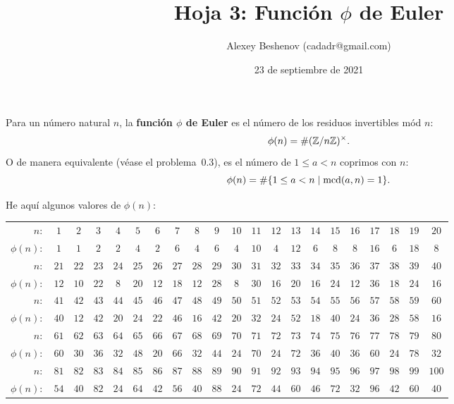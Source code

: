 \documentclass{article}
\title{Hoja 3: Función $\phi$ de Euler}
\author{Alexey Beshenov (cadadr@gmail.com)}
\date{23 de septiembre de 2021}
\begin{document}
\maketitle

\setcounter{section}{3}

\begin{definicion}
  Para un número natural $n$, la \textbf{función $\phi$ de Euler} es el número
  de los residuos invertibles mód $n$:
  $$\phi (n) = \# (\mathbb{Z}/n\mathbb{Z})^\times.$$
  O de manera equivalente (véase el problema~0.3),
  es el número de $1 \le a < n$ coprimos con $n$:
  $$\phi (n) = \# \{ 1 \le a < n \mid \operatorname{mcd} (a,n) = 1 \}.$$
\end{definicion}

\begin{ejemplo}
  He aquí algunos valores de $\phi (n)$:

  \begin{center}
    \begin{tabular}{rcccccccccccccccccccc}
      \hline
      $n\colon$ & $1$& $2$& $3$& $4$& $5$& $6$& $7$& $8$& $9$& $10$& $11$& $12$& $13$& $14$& $15$& $16$& $17$& $18$& $19$& $20$ \\
      $\phi(n)\colon$ & $1$& $1$& $2$& $2$& $4$& $2$& $6$& $4$& $6$& $4$& $10$& $4$& $12$& $6$& $8$& $8$& $16$& $6$& $18$& $8$ \\
      \hline
      $n\colon$ & $21$& $22$& $23$& $24$& $25$& $26$& $27$& $28$& $29$& $30$& $31$& $32$& $33$& $34$& $35$& $36$& $37$& $38$& $39$& $40$ \\
      $\phi(n)\colon$ & $12$& $10$& $22$& $8$& $20$& $12$& $18$& $12$& $28$& $8$& $30$& $16$& $20$& $16$& $24$& $12$& $36$& $18$& $24$& $16$ \\
      \hline
      $n\colon$ & $41$& $42$& $43$& $44$& $45$& $46$& $47$& $48$& $49$& $50$& $51$& $52$& $53$& $54$& $55$& $56$& $57$& $58$& $59$& $60$ \\
      $\phi(n)\colon$ & $40$& $12$& $42$& $20$& $24$& $22$& $46$& $16$& $42$& $20$& $32$& $24$& $52$& $18$& $40$& $24$& $36$& $28$& $58$& $16$ \\
      \hline
      $n\colon$ & $61$& $62$& $63$& $64$& $65$& $66$& $67$& $68$& $69$& $70$& $71$& $72$& $73$& $74$& $75$& $76$& $77$& $78$& $79$& $80$ \\
      $\phi(n)\colon$ & $60$& $30$& $36$& $32$& $48$& $20$& $66$& $32$& $44$& $24$& $70$& $24$& $72$& $36$& $40$& $36$& $60$& $24$& $78$& $32$ \\
      \hline
      $n\colon$ & $81$& $82$& $83$& $84$& $85$& $86$& $87$& $88$& $89$& $90$& $91$& $92$& $93$& $94$& $95$& $96$& $97$& $98$& $99$& $100$ \\
      $\phi(n)\colon$ & $54$& $40$& $82$& $24$& $64$& $42$& $56$& $40$& $88$& $24$& $72$& $44$& $60$& $46$& $72$& $32$& $96$& $42$& $60$& $40$ \\
      \hline
    \end{tabular}
  \end{center}
\end{ejemplo}
\end{document}
